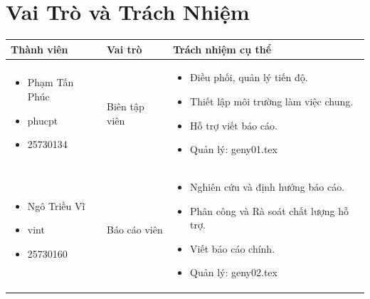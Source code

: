 \documentclass[12pt,a4paper]{article}
\begin{document}
\section{Vai Trò và Trách Nhiệm}
\noindent
\begin{table}[H]
\centering
\renewcommand{\arraystretch}{1.3} 
\begin{tabularx}{\textwidth}{|m{3.5cm}|m{2.5cm}|>{\arraybackslash}X|} 
\hline
\rowcolor{gray!15}
\textbf{Thành viên} & \textbf{Vai trò} & \textbf{Trách nhiệm cụ thể} \\ \hline

\begin{itemize}[leftmargin=*, nosep, before=\vspace{8pt}, after=\vspace{8pt}]
    \item Phạm Tấn Phúc
    \item phucpt
    \item 25730134
\end{itemize} & Biên tập viên & 
\begin{itemize}[leftmargin=*, nosep, before=\vspace{8pt}, after=\vspace{8pt}]
    \item Điều phối, quản lý tiến độ.
    \item Thiết lập môi trường làm việc chung.
    \item Hỗ trợ viết báo cáo.
    \item Quản lý: geny01.tex
\end{itemize} \\ \hline

\begin{itemize}[leftmargin=*, nosep, before=\vspace{8pt}, after=\vspace{8pt}]
    \item Ngô Triều Vĩ
    \item vint
    \item 25730160
\end{itemize} & Báo cáo viên & 
\begin{itemize}[leftmargin=*, nosep, before=\vspace{8pt}, after=\vspace{8pt}]
    \item Nghiên cứu và định hướng báo cáo.
    \item Phân công và Rà soát chất lượng hỗ trợ.
    \item Viết báo cáo chính.
    \item Quản lý: geny02.tex
\end{itemize} \\ \hline


\end{tabularx}
\end{table}
\end{document}
